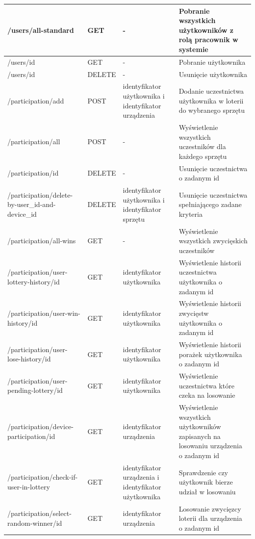 		\begin{table}[H]
	\centering
	\label{tab:rest}
	\begin{tabularx}{\linewidth}{|X|X|X|X|}
	 
		
		 /users/all-standard	& GET & -& Pobranie wszystkich użytkowników z rolą pracownik w systemie\\
		\hline
		 /users/id & GET & - & Pobranie użytkownika\\
		\hline
		 /users/id & DELETE & - & Usunięcie użytkownika\\
		\hline
		 /participation/add & POST & identyfikator użytkownika i identyfikator urządzenia & Dodanie uczestnictwa użytkownika w loterii do wybranego sprzętu\\
		\hline
		 /participation/all& POST & - & Wyświetlenie wszystkich uczestników dla każdego sprzętu\\
		\hline
		 /participation/id & DELETE & - & Usunięcie uczestnictwa o zadanym id\\
		\hline
		 /participation/delete-by-user\_id-and-device\_id& DELETE & identyfikator użytkownika i identyfikator sprzętu & Usunięcie uczestnictwa spełniającego zadane kryteria\\
		\hline
		 /participation/all-wins& GET & - & Wyświetlenie wszystkich zwycięskich uczestników\\
		\hline
		 /participation/user-lottery-history/id & GET& identyfikator użytkownika & Wyświetlenie historii uczestnictwa użytkownika o zadanym id\\
		\hline
		 /participation/user-win-history/id & GET& identyfikator użytkownika & Wyświetlenie historii zwycięstw użytkownika o zadanym id\\
		\hline
		 /participation/user-lose-history/id & GET& identyfikator użytkownika & Wyświetlenie historii porażek użytkownika o zadanym id\\
		\hline
		 /participation/user-pending-lottery/id & GET& identyfikator użytkownika & Wyświetlenie uczestnictwa które czeka na losowanie\\
		\hline
		 /participation/device-participation/id& GET& identyfikator urządzenia & Wyświetlenie wszystkich użytkowników zapisanych na losowaniu urządzenia o zadanym id\\
		\hline
		 /participation/check-if-user-in-lottery& GET& identyfikator urządzenia i identyfikator użytkownika& Sprawdzenie czy użytkownik bierze udział w losowaniu\\
		\hline
		 /participation/select-random-winner/id& GET& identyfikator urządzenia& Losowanie zwycięzcy loterii dla urządzenia o zadanym id\\
		\hline
\end{tabularx}
\end{table}




